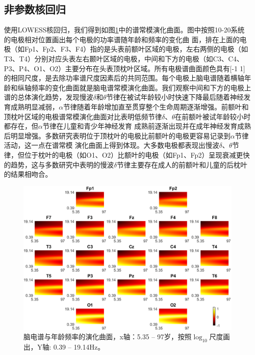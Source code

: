 \subsection{非参数核回归}
使用LOWESS核回归，我们得到如图\ref{6:surf}中的谱常模演化曲面。图中按照10-20系统的电极相对位置画出每个电极的功率谱随年龄和频率的变化曲
面，排在上面的电极（如Fp1、Fp2、F3、F4）指的是头表前额叶区域的电极，左右两侧的电极（如T3、T4）分别对应头表左右颞叶区域的电极，中间和下方的电极（如C3、C4、P3、P4、O1、O2）主要分布在头表顶枕叶区域。所有电极谱曲面颜色具有[-1 1]的相同尺度，是去除功率谱尺度因素后的共同范围。每个电极上脑电谱随着横轴年龄和纵轴频率的变化曲面就是脑电谱常模演化曲面。我们观察中间和下方的电极上谱的总体演化趋势，发现慢波$\delta$和$\theta$节律在被试年龄较小时快速下降最后随着神经发育成熟明显减弱，$\alpha$节律随着年龄增加直至贯穿整个生命周期逐渐增强。前额叶和
顶枕叶区域的电极谱常模演化曲面对比表明低频节律$\delta$、$\theta$在前额叶被试年龄较小时都存在，但$\alpha$节律在儿童和青少年神经发育
成熟前逐渐出现并在成年神经发育成熟后明显增强。多数研究表明位于顶枕叶的电极比前额叶的电极更容易记录到$\alpha$节律活动，这一点在谱常模
演化曲面上得到体现。大多数电极都表现出慢波$\delta$、$\theta$节律，但位于枕叶的电极（如O1、O2）比额叶的电极（如Fp1、Fp2）呈现衰减更快
的趋势，这与多数研究中表明的慢波$\delta$节律主要存在成人的前额叶和儿童的后枕叶的结果相吻合。
\begin{figure}[!ht]
\includegraphics[width=15cm]{pic/Norm/figure6.png}
\caption{脑电谱与年龄频率的演化曲面，x轴：5.35 – 97岁，按照$\log_{10}$尺度画出，Y轴: 0.39 – 19.14Hz。}
\label{6:surf}
\end{figure}

